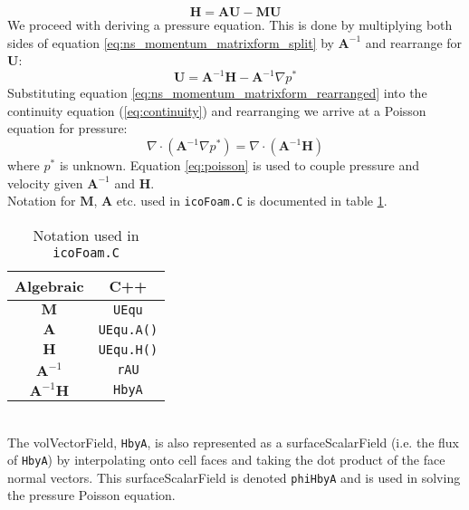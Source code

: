 \documentclass[a4paper,11pt]{report}
\begin{document}
\begin{equation}
    \mathbf{H} = \mathbf{A}\mathbf{U} - \mathbf{M}\mathbf{U}
    \label{eq:h_matrix}
\end{equation}
We proceed with deriving a pressure equation. This is done by multiplying both sides of equation \ref{eq:ns_momentum_matrixform_split} by $\mathbf{A}^{-1}$ and rearrange for $\mathbf{U}$:
\begin{equation}
    \mathbf{U} = \mathbf{A}^{-1}\mathbf{H} - \mathbf{A}^{-1}\nabla{p^*}
    \label{eq:ns_momentum_matrixform_rearranged}
\end{equation}
Substituting equation \ref{eq:ns_momentum_matrixform_rearranged} into the continuity equation (\ref{eq:continuity}) and rearranging we arrive at a Poisson equation for pressure:
\begin{equation}
    \nabla\cdot(\mathbf{A}^{-1}\nabla{p^*}) = \nabla\cdot(\mathbf{A}^{-1}\mathbf{H})
    \label{eq:poisson}
\end{equation}
where $p^*$ is unknown. Equation \ref{eq:poisson} is used to couple pressure and velocity given $\mathbf{A}^{-1}$ and $\mathbf{H}$.
\vspace{5mm}\\
Notation for $\mathbf{M}$, $\mathbf{A}$ etc. used in \texttt{icoFoam.C} is documented in table \ref{table:icofoam_notation}.
\begin{table}[ht]
\begin{center}
\begin{tabular}{ c | c }
    Algebraic & C++ \\
    \hline\hline
    $\mathbf{M}$ & \texttt{UEqu} \\
    \hline
    $\mathbf{A}$ & \texttt{UEqu.A()} \\
    \hline
    $\mathbf{H}$ & \texttt{UEqu.H()} \\
    \hline
    $\mathbf{A}^{-1}$ & \texttt{rAU} \\
    \hline
    $\mathbf{A}^{-1}\mathbf{H}$ & \texttt{HbyA}
\end{tabular}
\end{center}
\caption{Notation used in \texttt{icoFoam.C}}
\label{table:icofoam_notation}
\end{table}
\vspace{5mm}\\
The volVectorField, \texttt{HbyA}, is also represented as a surfaceScalarField (i.e. the flux of \texttt{HbyA}) by interpolating onto cell faces and taking the dot product of the face normal vectors. This surfaceScalarField is denoted \texttt{phiHbyA} and is used in solving the pressure Poisson equation.
\end{document}
